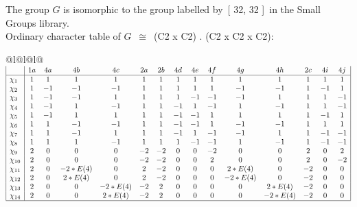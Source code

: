 \documentclass[varwidth=\maxdimen,border=10]{standalone}
\begin{document}
The group $G$ is isomorphic to the group labelled by\ [ 32, 32 ]\ in the Small Groups library.\\
Ordinary character table of $G$\ $\cong$\ (C2 x C2) . (C2 x C2 x C2):\\
\begin{center}
\begin{tabular}{@{}l@{}l@{}l@{}}
\hline
\(\begin{array}{|l|cccccccccccccc|}
  & 1a & 4a & 4b & 4c & 2a & 2b & 4d & 4e & 4f & 4g & 4h & 2c & 4i & 4j\\ \hline
\chi_{1} & 1 & 1 & 1 & 1 & 1 & 1 & 1 & 1 & 1 & 1 & 1 & 1 & 1 & 1\\
\chi_{2} & 1 & -1 & -1 & -1 & 1 & 1 & 1 & 1 & 1 & -1 & -1 & 1 & -1 & 1\\
\chi_{3} & 1 & -1 & -1 & 1 & 1 & 1 & 1 & -1 & -1 & -1 & 1 & 1 & 1 & -1\\
\chi_{4} & 1 & -1 & 1 & -1 & 1 & 1 & -1 & 1 & -1 & 1 & -1 & 1 & 1 & -1\\
\chi_{5} & 1 & -1 & 1 & 1 & 1 & 1 & -1 & -1 & 1 & 1 & 1 & 1 & -1 & 1\\
\chi_{6} & 1 & 1 & -1 & -1 & 1 & 1 & -1 & -1 & 1 & -1 & -1 & 1 & 1 & 1\\
\chi_{7} & 1 & 1 & -1 & 1 & 1 & 1 & -1 & 1 & -1 & -1 & 1 & 1 & -1 & -1\\
\chi_{8} & 1 & 1 & 1 & -1 & 1 & 1 & 1 & -1 & -1 & 1 & -1 & 1 & -1 & -1\\
\chi_{9} & 2 & 0 & 0 & 0 & -2 & -2 & 0 & 0 & -2 & 0 & 0 & 2 & 0 & 2\\
\chi_{10} & 2 & 0 & 0 & 0 & -2 & -2 & 0 & 0 & 2 & 0 & 0 & 2 & 0 & -2\\
\chi_{11} & 2 & 0 & -2*E(4) & 0 & 2 & -2 & 0 & 0 & 0 & 2*E(4) & 0 & -2 & 0 & 0\\
\chi_{12} & 2 & 0 & 2*E(4) & 0 & 2 & -2 & 0 & 0 & 0 & -2*E(4) & 0 & -2 & 0 & 0\\
\chi_{13} & 2 & 0 & 0 & -2*E(4) & -2 & 2 & 0 & 0 & 0 & 0 & 2*E(4) & -2 & 0 & 0\\
\chi_{14} & 2 & 0 & 0 & 2*E(4) & -2 & 2 & 0 & 0 & 0 & 0 & -2*E(4) & -2 & 0 & 0\\
\hline
\end{array}\)\\
\end{tabular}
\end{center}
\end{document}
